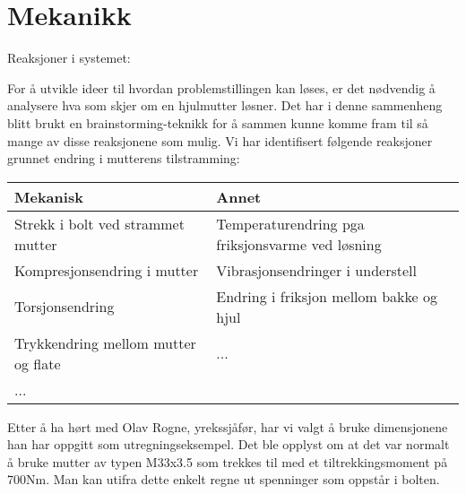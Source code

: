 \chapter{Mekanikk}
Reaksjoner i systemet:

For å utvikle ideer til hvordan problemstillingen kan løses, er det nødvendig å analysere hva som skjer om en hjulmutter løsner. Det har i denne sammenheng blitt brukt en brainstorming-teknikk for å sammen kunne komme fram til så mange av disse reaksjonene som mulig. Vi har identifisert følgende reaksjoner grunnet endring i mutterens tilstramming:

\begin{table}[h]
\begin{tabular}{|l|l|}
\hline
\textbf{Mekanisk}                   & \textbf{Annet}                                   \\
\hline
Strekk i bolt ved strammet mutter   & Temperaturendring pga friksjonsvarme ved løsning \\
\hline
Kompresjonsendring i mutter         & Vibrasjonsendringer i understell                 \\
\hline
Torsjonsendring                     & Endring i friksjon mellom bakke og hjul          \\
\hline
Trykkendring mellom mutter og flate & ...                                              \\
\hline
...                                 &                                                 \\
\hline
\end{tabular}
\end{table}

Etter å ha hørt med Olav Rogne, yrekssjåfør, har vi valgt å bruke dimensjonene han har oppgitt som utregningseksempel. Det ble opplyst om at det var normalt å bruke mutter av typen M33x3.5 som trekkes til med et tiltrekkingsmoment på 700Nm. Man kan utifra dette enkelt regne ut spenninger som oppstår i bolten.

